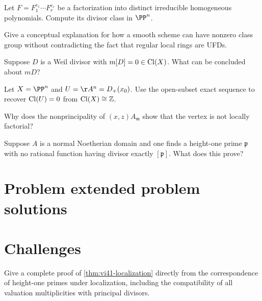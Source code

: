 \begin{problem}\label{prob:vi41-07}
Let \(F=F_1^{e_1}\cdots F_r^{e_r}\) be a factorization into distinct irreducible homogeneous polynomials. Compute its divisor class in \(\PP^n\).
\end{problem}

\begin{problem}\label{prob:vi41-08}
Give a conceptual explanation for how a smooth scheme can have nonzero class group without contradicting the fact that regular local rings are UFDs.
\end{problem}

\begin{problem}\label{prob:vi41-09}
Suppose \(D\) is a Weil divisor with \(m[D]=0\in\operatorname{Cl}(X)\). What can be concluded about \(mD\)?
\end{problem}

\begin{problem}\label{prob:vi41-10}
Let \(X=\PP^n\) and \(U=\AA^n=D_+(x_0)\). Use the open-subset exact sequence to recover \(\operatorname{Cl}(U)=0\) from \(\operatorname{Cl}(X)\cong\mathbb Z\).
\end{problem}

\begin{problem}\label{prob:vi41-11}
Why does the nonprincipality of \((x,z)A_{\mathfrak m}\) show that the vertex is not locally factorial?
\end{problem}

\begin{problem}\label{prob:vi41-12}
Suppose \(A\) is a normal Noetherian domain and one finds a height-one prime \(\mathfrak p\) with no rational function having divisor exactly \([\mathfrak p]\). What does this prove?
\end{problem}

\ifdefined\FullProblemDossiers
\section{Problem extended problem solutions}

\fi

\section{Challenges}

\begin{problem}\label{chal:vi41-01}
Give a complete proof of \cref{thm:vi41-localization} directly from the correspondence of height-one primes under localization, including the compatibility of all valuation multiplicities with principal divisors.
\end{problem}

